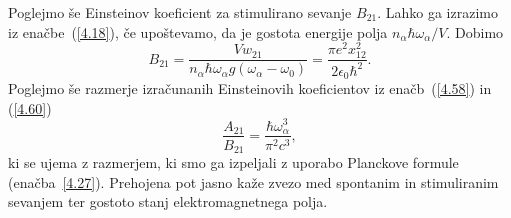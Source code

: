 Poglejmo še Einsteinov koeficient za stimulirano sevanje $B_{21}$. Lahko ga 
izrazimo iz enačbe~(\ref{4.18}), če upoštevamo, da je gostota energije 
polja $n_{\alpha}\hbar\omega_{\alpha}/V$. Dobimo
\begin{equation}
B_{21}=\frac{Vw_{21}}{n_{\alpha}\hbar\omega_{\alpha} g(\omega_{\alpha}-\omega_0)}
=\frac{\pi e^{2}x_{12}^{2}}{2\epsilon_{0}\hbar^{2}}.
\label{4.60}
\end{equation}
Poglejmo  še razmerje izračunanih Einsteinovih koeficientov iz enačb~(\ref{4.58}) in 
(\ref{4.60})
\begin{equation}
 \frac{A_{21}}{B_{21}}=\frac{\hbar \omega_\alpha^3}{\pi^2 c^3},
\end{equation}
ki se ujema z razmerjem, ki smo ga izpeljali z uporabo
Planckove formule (enačba~\ref{4.27}). Prehojena pot jasno kaže zvezo med spontanim in
stimuliranim sevanjem ter gostoto stanj elektromagnetnega polja. 